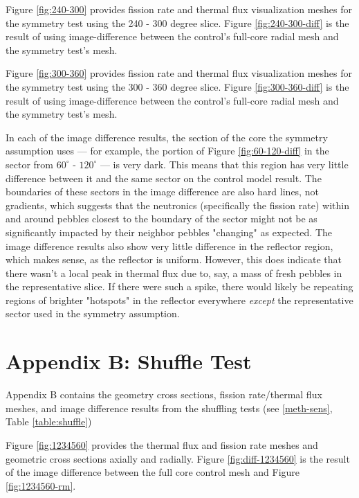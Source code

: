 Figure \ref{fig:240-300} provides fission rate and thermal flux visualization meshes for the symmetry test using the 240 - 300 degree slice.  Figure \ref{fig:240-300-diff} is the result of using image-difference between the control's full-core radial mesh and the symmetry test's mesh.




Figure \ref{fig:300-360} provides fission rate and thermal flux visualization meshes for the symmetry test using the 300 - 360 degree slice.  Figure \ref{fig:300-360-diff} is the result of using image-difference between the control's full-core radial mesh and the symmetry test's mesh.


In each of the image difference results, the section of the core the symmetry assumption  uses --- for example, the portion of Figure \ref{fig:60-120-diff} in the sector from $60^{\circ}$ - $120^{\circ}$ --- is very dark.  This means that this region has very little difference between it and the same sector on the control model result.  The boundaries of these sectors in the image difference are also hard lines, not gradients, which suggests that the neutronics (specifically the fission rate) within and around pebbles closest to the boundary of the sector might not be as significantly impacted by their neighbor pebbles "changing" as expected.  The image difference results also show very little difference in the reflector region, which makes sense, as the reflector is uniform.  However, this does indicate that there wasn't a local peak in thermal flux due to, say, a mass of fresh pebbles in the representative slice.  If there were such a spike, there would likely be repeating regions of brighter "hotspots" in the reflector everywhere \emph{except} the representative sector used in the symmetry assumption.

\section{Appendix B: Shuffle Test}
\label{app-shuf}
Appendix B contains the geometry cross sections, fission rate/thermal flux meshes, and image difference results from the shuffling tests (see \autoref{meth-sens}, Table \ref{table:shuffle})





Figure \ref{fig:1234560} provides the thermal flux and fission rate meshes and geometric cross sections axially and radially.  Figure \ref{fig:diff-1234560} is the result of the image difference between the full core control mesh and Figure \ref{fig:1234560-rm}.

